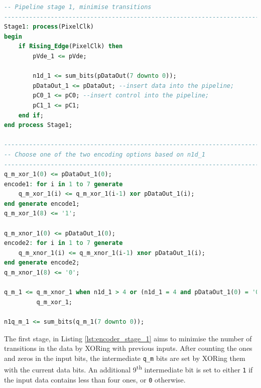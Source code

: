 \begin{lstlisting}[caption={TMDS encoder transition minimisation stage.}, label={lst:encoder_stage_1}, language=VHDL]
-- Pipeline stage 1, minimise transitions
----------------------------------------------------------------------------------
Stage1: process(PixelClk)
begin
    if Rising_Edge(PixelClk) then
        pVde_1 <= pVde;

        n1d_1 <= sum_bits(pDataOut(7 downto 0));
        pDataOut_1 <= pDataOut; --insert data into the pipeline;
        pC0_1 <= pC0; --insert control into the pipeline;
        pC1_1 <= pC1;
    end if;
end process Stage1;

----------------------------------------------------------------------------------
-- Choose one of the two encoding options based on n1d_1
----------------------------------------------------------------------------------
q_m_xor_1(0) <= pDataOut_1(0);
encode1: for i in 1 to 7 generate
    q_m_xor_1(i) <= q_m_xor_1(i-1) xor pDataOut_1(i);
end generate encode1;
q_m_xor_1(8) <= '1';

q_m_xnor_1(0) <= pDataOut_1(0);
encode2: for i in 1 to 7 generate
    q_m_xnor_1(i) <= q_m_xnor_1(i-1) xnor pDataOut_1(i);
end generate encode2;
q_m_xnor_1(8) <= '0';

q_m_1 <= q_m_xnor_1 when n1d_1 > 4 or (n1d_1 = 4 and pDataOut_1(0) = '0') else
         q_m_xor_1;

n1q_m_1 <= sum_bits(q_m_1(7 downto 0));
\end{lstlisting}

The first stage, in Listing \ref{lst:encoder_stage_1} aims to minimise the number of transitions in the data by XORing with previous inputs. After counting the ones and zeros in the input bits, the intermediate \texttt{q\_m} bits are set by XORing them with the current data bits. An additional 9\textsuperscript{th} intermediate bit is set to either \texttt{1} if the input data contains less than four ones, or \texttt{0} otherwise.

